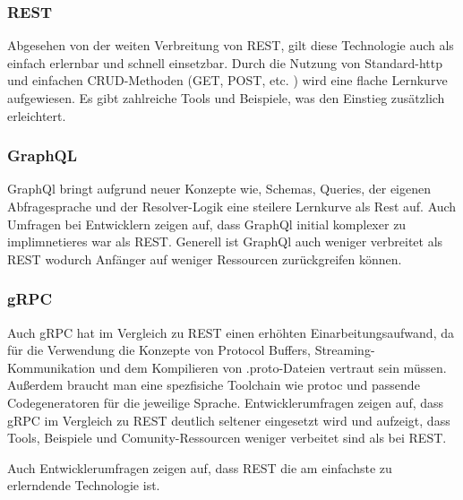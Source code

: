 \subsubsection{REST}
Abgesehen von der weiten Verbreitung von REST, gilt diese Technologie auch als einfach erlernbar und schnell einsetzbar. Durch die Nutzung von Standard-http und einfachen CRUD-Methoden (GET, POST, etc. ) wird eine flache Lernkurve aufgewiesen. Es gibt zahlreiche Tools und Beispiele, was den Einstieg zusätzlich erleichtert.

\subsubsection{GraphQL}
GraphQl bringt aufgrund neuer Konzepte wie, Schemas, Queries, der eigenen Abfragesprache und der Resolver-Logik eine steilere Lernkurve als Rest auf. Auch Umfragen bei Entwicklern zeigen auf, dass GraphQl initial komplexer zu implimnetieres war als REST. Generell ist GraphQl auch weniger verbreitet als REST wodurch Anfänger auf weniger Ressourcen zurückgreifen können.

\subsubsection{gRPC}
Auch gRPC hat im Vergleich zu REST einen erhöhten Einarbeitungsaufwand, da für die Verwendung die Konzepte von Protocol Buffers, Streaming-Kommunikation und dem Kompilieren von .proto-Dateien vertraut sein müssen. Außerdem braucht man eine spezfisiche Toolchain wie protoc und passende Codegeneratoren für die jeweilige Sprache. Entwicklerumfragen  zeigen auf, dass gRPC im Vergleich zu REST deutlich seltener eingesetzt wird und aufzeigt, dass Tools, Beispiele und Comunity-Ressourcen weniger verbeitet sind als bei REST.

Auch Entwicklerumfragen zeigen auf, dass REST die am einfachste zu erlerndende Technologie ist. 

\chapterend
